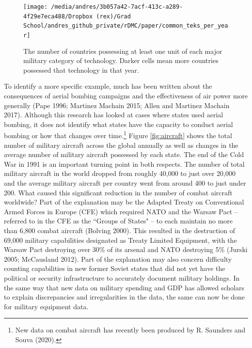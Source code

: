 \documentclass[
]{article}
\begin{document}
\begin{figure}[H]

{\centering \texttt{[image: /media/andres/3b057a42-7acf-413c-a289-4f29e7eca488/Dropbox (rex)/Grad School/andres\_github\_private/rDMC/paper/common\_teks\_per\_year]} 

}

\caption{The number of countries possessing at least one unit of each major military category of technology. Darker cells mean more countries possessed that technology in that year.}\label{fig:common-teks}
\end{figure}

To identify a more specific example, much has been written about the consequences of aerial bombing campaigns and the effectiveness of air power more generally (Pape 1996; Martinez Machain 2015; Allen and Martinez Machain 2017). Although this research has looked at cases where states used aerial bombing, it does not identify what states have the capacity to conduct aerial bombing or how that changes over time.\footnote{New data on combat aircraft has recently been produced by R. Saunders and Souva (2020).} Figure \ref{fig:aircraft} shows the total number of military aircraft across the global annually as well as changes in the average number of military aircraft possessed by each state. The end of the Cold War in 1991 is an important turning point in both respects. The number of total military aircraft in the world dropped from roughly 40,000 to just over 20,000 and the average military aircraft per country went from around 400 to just under 200. What caused this significant reduction in the number of combat aircraft worldwide? Part of the explanation may be the Adapted Treaty on Conventional Armed Forces in Europe (CFE) which required NATO and the Warsaw Pact -- referred to in the CFE as the ``Groups of States" -- to each maintain no more than 6,800 combat aircraft (Bolving 2000). This resulted in the destruction of 69,000 military capabilities designated as Treaty Limited Equipment, with the Warsaw Pact destroying over 30\% of its arsenal and NATO destroying 5\% (Jurski 2005; McCausland 2012). Part of the explanation may also concern difficulty counting capabilities in new former Soviet states that did not yet have the political or security infrastructure to accurately document military holdings. In the same way that new data on military spending and GDP has allowed scholars to explain discrepancies and irregularities in the data, the same can now be done for military equipment data.
\end{document}
